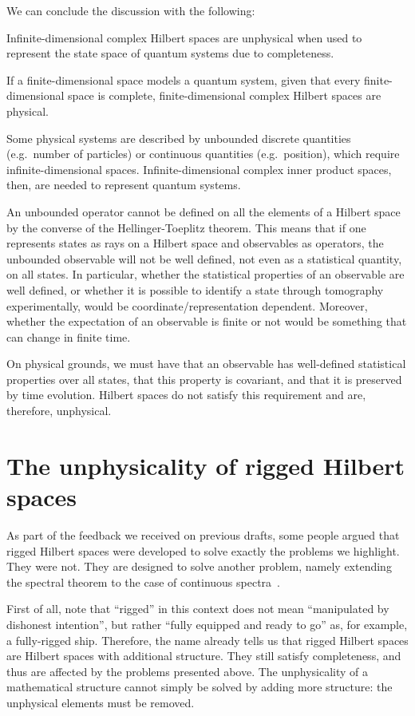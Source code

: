 \documentclass[10pt,twocolumn, nofootinbib]{revtex4-2}
\begin{document}
We can conclude the discussion with the following:
\begin{prop}
Infinite-dimensional complex Hilbert spaces are unphysical when used to represent the state space of quantum systems due to completeness.
\end{prop}
\begin{justification}
If a finite-dimensional space models a quantum system, given that every finite-dimensional space is complete, finite-dimensional complex Hilbert spaces are physical.

Some physical systems are described by unbounded discrete quantities (e.g.~number of particles) or continuous quantities (e.g.~position), which require infinite-dimensional spaces. Infinite-dimensional complex inner product spaces, then, are needed to represent quantum systems.

An unbounded operator cannot be defined on all the elements of a Hilbert space by the converse of the Hellinger-Toeplitz theorem. This means that if one represents states as rays on a Hilbert space and observables as operators, the unbounded observable will not be well defined, not even as a statistical quantity, on all states. In particular, whether the statistical properties of an observable are well defined, or whether it is possible to identify a state through tomography experimentally, would be coordinate/representation dependent. Moreover, whether the expectation of an observable is finite or not would be something that can change in finite time.

On physical grounds, we must have that an observable has well-defined statistical properties over all states, that this property is covariant, and that it is preserved by time evolution. Hilbert spaces do not satisfy this requirement and are, therefore, unphysical.
\end{justification}

\section{The unphysicality of rigged Hilbert spaces}

As part of the feedback we received on previous drafts, some people argued that rigged Hilbert spaces were developed to solve exactly the problems we highlight. They were not. They are designed to solve another problem, namely extending the spectral theorem to the case of continuous spectra~\cite{Madrid_2005, reed_methods_1980, Landsman2017}.

First of all, note that ``rigged'' in this context does not mean ``manipulated by dishonest intention'', but rather ``fully equipped and ready to go'' as, for example, a fully-rigged ship. Therefore, the name already tells us that rigged Hilbert spaces are Hilbert spaces with additional structure. They still satisfy completeness, and thus are affected by the problems presented above. The unphysicality of a mathematical structure cannot simply be solved by adding more structure: the unphysical elements must be removed.
\end{document}
